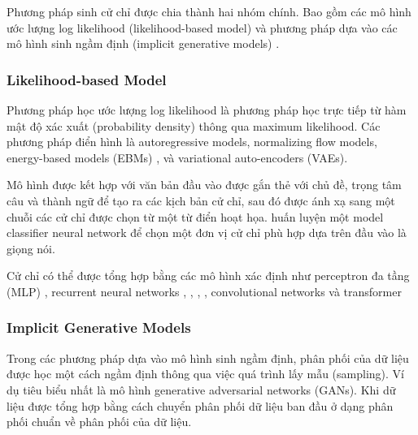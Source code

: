 Phương pháp sinh cử chỉ được chia thành hai nhóm chính. Bao gồm các mô hình ước lượng log likelihood (likelihood-based model)  và phương pháp dựa vào các mô hình sinh ngầm định (implicit generative models) \cite{song2021score}. 

\subsubsection{Likelihood-based Model}

Phương pháp học ước lượng log likelihood là phương pháp học trực tiếp từ hàm mật độ xác xuất (probability density) thông qua maximum likelihood. Các phương pháp điển hình là autoregressive models, normalizing flow models, energy-based models (EBMs)
, và variational auto-encoders (VAEs).


Mô hình được kết hợp với văn bản đầu vào được gắn thẻ với chủ đề, trọng tâm câu và thành ngữ để tạo ra các kịch bản cử chỉ, sau đó được ánh xạ sang một chuỗi các cử chỉ được chọn từ một từ điển hoạt họa. \cite{chiu2015predicting} huấn luyện một model classifier neural network để chọn một đơn vị cử chỉ phù hợp dựa trên đầu vào là giọng nói. 

Cử chỉ có thể được tổng hợp bằng các mô hình xác định như perceptron đa tầng (MLP) \cite{kucherenko2020gesticulator}, recurrent neural networks \cite{bhattacharya2021speech2affectivegestures}, \cite{liu2022learning}, \cite{hasegawa2018evaluation}, \cite{yoon2020speech}, convolutional networks \cite{habibie2021learning} và transformer \cite{bhattacharya2021text2gestures} 

\subsubsection{Implicit Generative Models}

Trong các phương pháp dựa vào mô hình sinh ngầm định, phân phối của dữ liệu được học một cách ngầm định thông qua việc quá trình lấy mẫu (sampling). Ví dụ tiêu biểu nhất là mô hình generative adversarial networks (GANs). Khi dữ liệu được tổng hợp bằng cách chuyển phân phối dữ liệu ban đầu ở dạng phân phối chuẩn về phân phối của dữ liệu.

